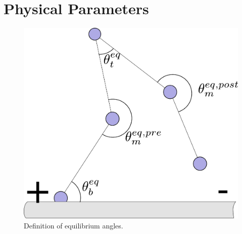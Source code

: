 \documentclass[10pt]{article} %
\begin{document}
\section{Physical Parameters}

\begin{figure}
  \centering
  \includegraphics[width=.45\textwidth]{../figures/equilibrium-onebound}
  \caption{Definition of equilibrium angles.}
  \label{fig:eq_angles}
\end{figure}

\end{document}
